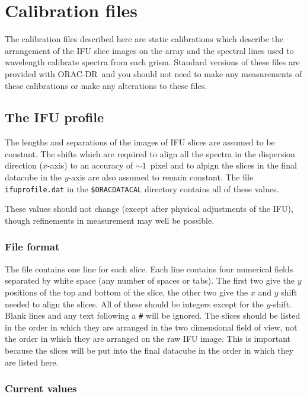 \documentclass[twoside,11pt]{article}
\renewcommand{\_}{\texttt{\symbol{95}}}
\newcommand{\ORACDR}{{\footnotesize ORAC-DR}}
\begin{document}
\section{Calibration files}

The calibration files described here are static calibrations which
describe the arrangement of the IFU slice images on the array and the
spectral lines used to wavelength calibrate spectra from each
grism. Standard versions of these files are provided with \ORACDR\ and
you should not need to make any measurements of these calibrations or
make any alterations to these files.

\subsection{The IFU profile}

The lengths and separations of the images of IFU slices are assumed to
be constant. The shifts which are required to align all the spectra in
the dispersion direction ($x$-axis) to an accuracy of $\sim 1$~pixel
and to alpign the slices in the final datacube in the $y$-axis are also
assumed to remain constant. The file {\tt ifu\_profile.dat} in the
{\tt \$ORAC\_DATA\_CAL} directory contains all of these values. 

These values should not change (except after physical adjustments of
the IFU), though refinements in measurement may well be possible.

\subsubsection{File format}

The file contains one line for each slice. Each line contains four
numerical fields separated by white space (any number of spaces or
tabs). The first two give the $y$ positions of the top and bottom of
the slice, the other two give the $x$ and $y$ shift needed to align
the slices. All of these should be integers except for the
$y$-shift. Blank lines and any text following a {\tt \#} will be
ignored. The slices should be listed in the order in which they are
arranged in the two dimensional field of view, not the order in which
they are arranged on the raw IFU image. This is important because the
slices will be put into the final datacube in the order in which they
are listed here.


\subsubsection{Current values}
\end{document}
